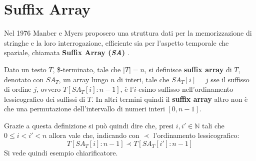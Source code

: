 \section{Suffix Array}
Nel 1976 Manber e Myers proposero una struttura dati per la memorizzazione di
stringhe e la loro interrogazione, efficiente sia per
l'aspetto temporale che spaziale, chiamata \textbf{Suffix Array (\textit{SA})}
\cite{sa}.
\begin{definizione}
  Dato un testo $T$, \$-terminato, tale che $|T|=n$, si definisce \textbf{suffix
    array} di $T$, denotato con $SA_T$, un array lungo $n$ di interi, tale che
  $SA_T[i]=j$ sse il suffisso di ordine $j$, ovvero $T[SA_T[i]:n-1]$, è
  l'$i$-esimo suffisso nell’ordinamento lessicografico dei suffissi di $T$. In
  altri termini quindi il \textbf{suffix array} altro non è che una permutazione
  dell'intervallo di numeri interi $[0,n-1]$.
\end{definizione}
Grazie a questa definizione si può quindi dire che, presi $i,i'\in \mathbb{N}$
tali che $0\leq i < i' < n$ allora vale che, indicando con $\prec$
l'ordinamento lessicografico:
\[T[SA_T[i]:n-1] \prec T[SA_T[i']:n-1]\]
Si vede quindi esempio chiarificatore.
